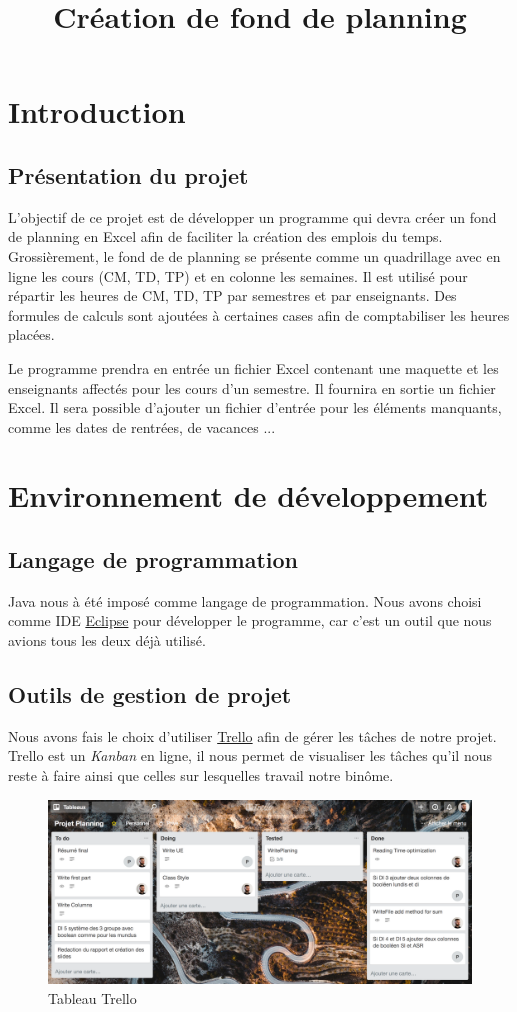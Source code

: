 \documentclass{polytech/polytech}
\title{Création de fond de planning}
\begin{document}
	\chapter{Introduction}
	\section{Présentation du projet}
	L’objectif de ce projet est de développer un programme qui devra créer un fond de planning en Excel afin de faciliter la création des emplois du temps.
	Grossièrement, le fond de de planning se présente comme un quadrillage avec en ligne les cours (CM, TD, TP) et en colonne les semaines.
	Il est utilisé pour répartir les heures de CM, TD, TP par semestres et par enseignants.
	Des formules de calculs sont ajoutées à certaines cases afin de comptabiliser les heures placées.

	Le programme prendra en entrée un fichier Excel contenant une maquette et les enseignants affectés pour les cours d'un semestre.
	Il fournira en sortie un fichier Excel.
	Il sera possible d'ajouter un fichier d'entrée pour les éléments manquants, comme les dates de rentrées, de vacances ...

	\chapter{Environnement de développement}
	\section{Langage de programmation}

	Java nous à été imposé comme langage de programmation.
	Nous avons choisi comme IDE \href{http://www.eclipse.org}{Eclipse} pour développer le programme, car c'est un outil que nous avions tous les deux déjà utilisé.

	\section{Outils de gestion de projet}

	Nous avons fais le choix d'utiliser \href{https://trello.com/}{Trello} afin de gérer les tâches de notre projet.
	Trello est un \textit{Kanban} en ligne, il nous permet de visualiser les tâches qu'il nous reste à faire ainsi que celles sur lesquelles travail notre binôme.

	\begin{figure}
		\caption{Tableau Trello}
		\includegraphics[width=\textwidth]{./img/trello.png}
	\end{figure}
\end{document}
